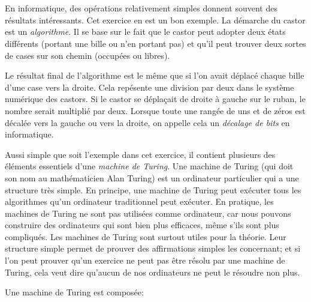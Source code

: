 {{%
\section*{\BrochureItsInformatics}
En informatique, des opérations relativement simples donnent souvent des résultats intéressants. Cet exercice en est un bon exemple. La démarche du castor est un \emph{algorithme}. Il se base sur le fait que le castor peut adopter deux états différents (portant une bille ou n’en portant pas) et qu’il peut trouver deux sortes de cases sur son chemin (occupées ou libres).

Le résultat final de l’algorithme est le même que si l’on avait déplacé chaque bille d’une case vers la droite. Cela repésente une division par deux dans le système numérique des castors. Si le castor se déplaçait de droite à gauche sur le ruban, le nombre serait multiplié par deux. Lorsque toute une rangée de uns et de zéros est décalée vers la gauche ou vers la droite, on appelle cela un \emph{décalage de bits} en informatique.

Aussi simple que soit l’exemple dans cet exercice, il contient plusieurs des éléments essentiels d’une \emph{machine de Turing}.
Une machine de Turing (qui doit son nom au mathématicien Alan Turing) est un ordinateur particulier qui a une structure très simple. En principe, une machine de Turing peut exécuter tous les algorithmes qu’un ordinateur traditionnel peut exécuter. En pratique, les machines de Turing ne sont pas utilisées comme ordinateur, car nous pouvons construire des ordinateurs qui sont bien plus efficaces, même s’ils sont plus compliqués. Les machines de Turing sont surtout utiles pour la théorie. Leur structure simple permet de prouver des affirmations simples les concernant; et si l’on peut prouver qu’un exercice ne peut pas être résolu par une machine de Turing, cela veut dire qu’aucun de nos ordinateurs ne peut le résoudre non plus.

Une machine de Turing est composée:

}}
